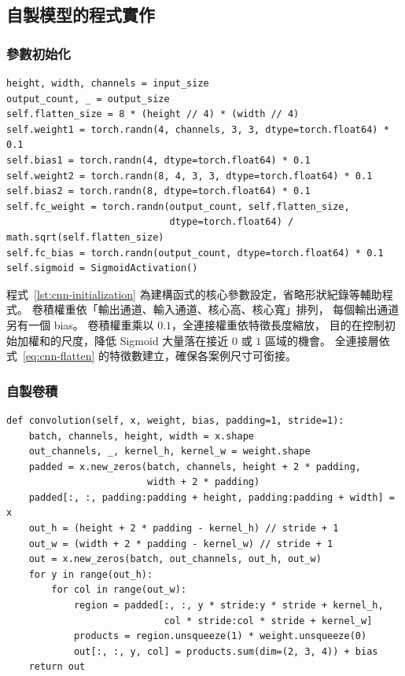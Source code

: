 \subsection{自製模型的程式實作}

\subsubsection{參數初始化}

\begin{lstlisting}[caption={自製 CNN 的參數初始化},label={lst:cnn-initialization}]
height, width, channels = input_size
output_count, _ = output_size
self.flatten_size = 8 * (height // 4) * (width // 4)
self.weight1 = torch.randn(4, channels, 3, 3, dtype=torch.float64) * 0.1
self.bias1 = torch.randn(4, dtype=torch.float64) * 0.1
self.weight2 = torch.randn(8, 4, 3, 3, dtype=torch.float64) * 0.1
self.bias2 = torch.randn(8, dtype=torch.float64) * 0.1
self.fc_weight = torch.randn(output_count, self.flatten_size,
                             dtype=torch.float64) / math.sqrt(self.flatten_size)
self.fc_bias = torch.randn(output_count, dtype=torch.float64) * 0.1
self.sigmoid = SigmoidActivation()
\end{lstlisting}

程式~\ref{lst:cnn-initialization} 為建構函式的核心參數設定，省略形狀紀錄等輔助程式。
卷積權重依「輸出通道、輸入通道、核心高、核心寬」排列，
每個輸出通道另有一個 bias。
卷積權重乘以 $0.1$，全連接權重依特徵長度縮放，
目的在控制初始加權和的尺度，降低 Sigmoid 大量落在接近 $0$ 或 $1$ 區域的機會。
全連接層依式~\eqref{eq:cnn-flatten} 的特徵數建立，確保各案例尺寸可銜接。

\subsubsection{自製卷積}

\begin{lstlisting}[caption={以 torch tensor 自行實作卷積},label={lst:cnn-convolution}]
def convolution(self, x, weight, bias, padding=1, stride=1):
    batch, channels, height, width = x.shape
    out_channels, _, kernel_h, kernel_w = weight.shape
    padded = x.new_zeros(batch, channels, height + 2 * padding,
                         width + 2 * padding)
    padded[:, :, padding:padding + height, padding:padding + width] = x
    out_h = (height + 2 * padding - kernel_h) // stride + 1
    out_w = (width + 2 * padding - kernel_w) // stride + 1
    out = x.new_zeros(batch, out_channels, out_h, out_w)
    for y in range(out_h):
        for col in range(out_w):
            region = padded[:, :, y * stride:y * stride + kernel_h,
                            col * stride:col * stride + kernel_w]
            products = region.unsqueeze(1) * weight.unsqueeze(0)
            out[:, :, y, col] = products.sum(dim=(2, 3, 4)) + bias
    return out
\end{lstlisting}

